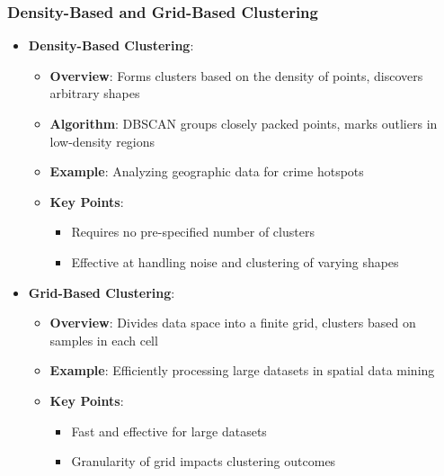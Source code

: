 \documentclass[aspectratio=169]{beamer}
\begin{document}
\begin{frame}[fragile]
    \frametitle{Density-Based and Grid-Based Clustering}
    \begin{itemize}
        \item \textbf{Density-Based Clustering}:
            \begin{itemize}
                \item \textbf{Overview}: Forms clusters based on the density of points, discovers arbitrary shapes
                \item \textbf{Algorithm}: DBSCAN groups closely packed points, marks outliers in low-density regions
                \item \textbf{Example}: Analyzing geographic data for crime hotspots
                \item \textbf{Key Points}:
                    \begin{itemize}
                        \item Requires no pre-specified number of clusters
                        \item Effective at handling noise and clustering of varying shapes
                    \end{itemize}
            \end{itemize}
    
        \item \textbf{Grid-Based Clustering}:
            \begin{itemize}
                \item \textbf{Overview}: Divides data space into a finite grid, clusters based on samples in each cell
                \item \textbf{Example}: Efficiently processing large datasets in spatial data mining
                \item \textbf{Key Points}:
                    \begin{itemize}
                        \item Fast and effective for large datasets
                        \item Granularity of grid impacts clustering outcomes
                    \end{itemize}
            \end{itemize}
    \end{itemize}
\end{frame}
\end{document}
